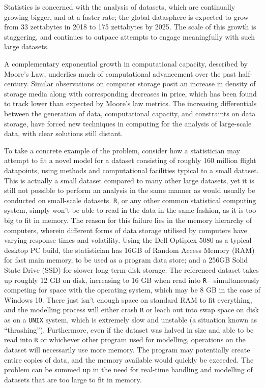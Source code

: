 Statistics is concerned with the analysis of datasets, which are continually growing bigger, and at a faster rate;
the global datasphere is expected to grow from 33 zettabytes in 2018 to 175 zettabytes by 2025\cite{rydning2018digitization}.
The scale of this growth is staggering, and continues to outpace attempts to engage meaningfully with such large datasets.

A complementary exponential growth in computational capacity, described by Moore's Law, underlies much of computational advancement over the past half-century\cite{moore1975progress}.
Similar observations on computer storage posit an increase in density of storage media along with corresponding decreases in price, which has been found to track lower than expected by Moore's law metrics\cite{fontana2018moore}.
The increasing differentials between the generation of data, computational capacity, and constraints on data storage, have forced new techniques in computing for the analysis of large-scale data, with clear solutions still distant.

To take a concrete example of the problem, consider how a statistician may attempt to fit a novel model for a dataset consisting of roughly 160 million flight datapoints\cite{bot2009flights}, using methods and computational facilities typical to a small dataset.
This is actually a small dataset compared to many other large datasets, yet it is still not possible to perform an analysis in the same manner as would usually be conducted on small-scale datasets.
\texttt{R}, or any other common statistical computing system, simply won't be able to read in the data in the same fashion, as it is too big to fit in memory.
The reason for this failure lies in the memory hierarchy of computers, wherein different forms of data storage utilised by computers have varying response times and volatility.
Using the Dell Optiplex 5080 as a typical desktop PC build, the statistician has 16GB of Random Access Memory (RAM) for fast main memory, to be used as a program data store; and a 256GB Solid State Drive (SSD) for slower long-term disk  storage\cite{cornell2021standardcomp}.
The referenced dataset takes up roughly 12 GB on disk, increasing to 16 GB when read into \texttt{R}---simultaneously competing for space with the operating system, which may be 8 GB in the case of Windows 10.
There just isn't enough space on standard RAM to fit everything, and the modelling process will either crash \texttt{R} or leach out into swap space on disk as on a \texttt{UNIX} system, which is extremely slow and unstable (a situation known as ``thrashing'')\cite{denning1968thrashing}.
Furthermore, even if the dataset was halved in size and able to be read into \texttt{R} or whichever other program used for modelling, operations on the dataset will necessarily use more memory.
The program may potentially create entire copies of data, and the memory available would quickly be exceeded.
The problem can be summed up in the need for real-time handling and modelling of datasets that are too large to fit in memory.

